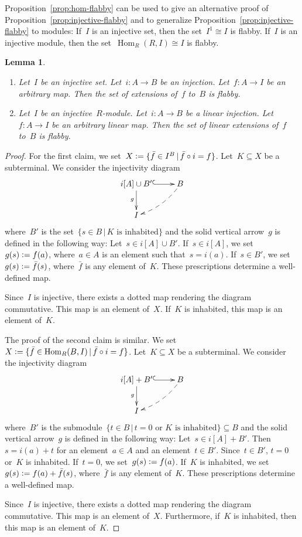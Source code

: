 \documentclass[oneside]{amsart}
\theoremstyle{definition}
\theoremstyle{plain}
\newtheorem{lemma}[defn]{Lemma}
\theoremstyle{remark}
\newcommand{\defeq}{\vcentcolon=}
\DeclareMathOperator{\Hom}{Hom}
\renewcommand{\_}{\mathpunct{.}\,}
\begin{document}
Proposition~\ref{prop:hom-flabby} can be used to give an alternative proof of
Proposition~\ref{prop:injective-flabby} and to generalize
Proposition~\ref{prop:injective-flabby} to modules: If~$I$ is an injective set,
then the set~$I^1 \cong I$ is flabby. If~$I$ is an injective module, then the
set~$\Hom_R(R,I) \cong I$ is flabby.

\begin{lemma}\label{lemma:set-of-extensions-flabby}
\begin{enumerate}
\item Let~$I$ be an injective set. Let~$i : A \to B$ be an injection.
Let~$f : A \to I$ be an arbitrary map. Then the set of extensions of~$f$ to~$B$
is flabby.
\item Let~$I$ be an injective~$R$-module. Let~$i : A \to B$ be a linear injection.
Let~$f : A \to I$ be an arbitrary linear map. Then the set of linear extensions of~$f$ to~$B$
is flabby.
\end{enumerate}
\end{lemma}

\begin{proof}For the first claim, we set~$X \defeq \{ \bar{f} \in I^B \,|\, \bar{f} \circ i =
f \}$. Let~$K \subseteq X$ be a subterminal. We consider the injectivity diagram
\[ \xymatrix{
  i[A] \cup B' \ar@{^{(}->}[r]\ar[d]_g & B \ar@{-->}@/^/[ld] \\
  I
} \]
where~$B'$ is the set~$\{ s \in B \,|\, \text{$K$ is inhabited} \}$ and the solid
vertical arrow~$g$ is defined in the following way: Let~$s \in i[A] \cup B'$.
If~$s \in i[A]$, we set~$g(s) \defeq f(a)$, where~$a \in A$ is an element such
that~$s = i(a)$. If~$s \in B'$, we set~$g(s) \defeq \bar{f}(s)$,
where~$\bar{f}$ is any element of~$K$. These prescriptions determine a well-defined
map.

Since~$I$ is injective, there exists a dotted map rendering the diagram
commutative. This map is an element of~$X$. If~$K$ is inhabited,
this map is an element of~$K$.

The proof of the second claim is similar. We
set~$X \defeq \{ \bar{f} \in \Hom_R(B,I) \,|\, \bar{f} \circ i =
f \}$. Let~$K \subseteq X$ be a subterminal. We consider the injectivity diagram
\[ \xymatrix{
  i[A] + B' \ar@{^{(}->}[r]\ar[d]_g & B \ar@{-->}@/^/[ld] \\
  I
} \]
where~$B'$ is the submodule~$\{ t \in B \,|\, \text{$t = 0$ or $K$ is
inhabited} \} \subseteq B$ and the solid vertical arrow~$g$ is defined in the following
way: Let~$s \in i[A] + B'$. Then~$s = i(a) + t$ for an element~$a \in A$ and an
element~$t \in B'$. Since~$t \in B'$, $t = 0$ or~$K$ is inhabited. If~$t = 0$,
we set~$g(s) \defeq f(a)$. If~$K$ is inhabited, we set~$g(s) \defeq f(a) +
\bar{f}(s)$, where~$\bar{f}$ is any element of~$K$. These prescriptions
determine a well-defined map.

Since~$I$ is injective, there exists a dotted map rendering the diagram
commutative. This map is an element of~$X$. Furthermore, if~$K$ is inhabited,
then this map is an element of~$K$.
\end{proof}
\end{document}
